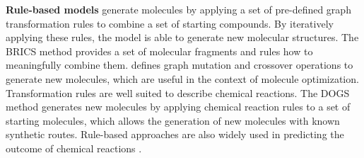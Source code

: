 \textbf{Rule-based models} generate molecules by applying a set of pre-defined graph transformation
rules to combine a set of starting compounds. By iteratively applying these rules, the model is able
to generate new molecular structures. The BRICS \citep{degenArtCompilingUsing2008} method provides a
set of molecular fragments and rules how to meaningfully combine
them. \citet{jensenGraphbasedGeneticAlgorithm2019} defines graph mutation and crossover operations to
generate new molecules, which are useful in the context of molecule optimization. Transformation
rules are well suited to describe chemical reactions. The DOGS method
\citep{hartenfellerDOGSReactionDrivenNovo2012} generates new molecules by applying chemical reaction
rules to a set of starting molecules, which allows the generation of new molecules with known
synthetic routes. Rule-based approaches are also widely used in predicting the outcome of chemical
reactions
\citep{seglerNeuralSymbolicMachineLearning2017,seglerPlanningChemicalSyntheses2018,fortunatoDataAugmentationPretraining2020}.


